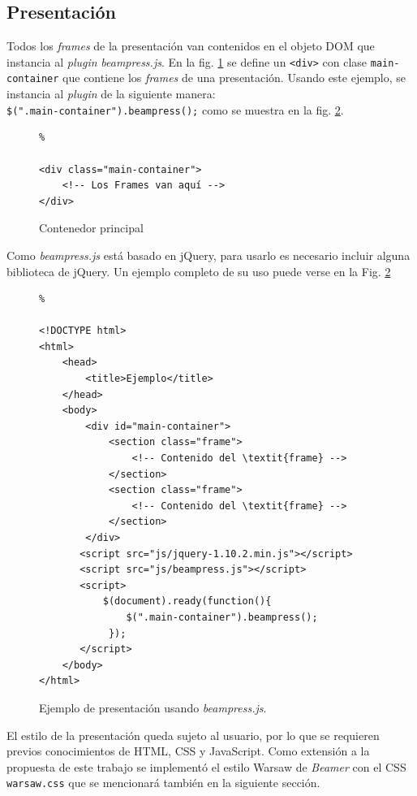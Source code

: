 		\subsection{Presentación} %
		\label{sub:presentacion}

			Todos los \textit{frames} de la presentación van contenidos en el objeto DOM que instancia al \textit{plugin} \textit{beampress.js}. En la fig. \ref{fig:main_container} se define un \texttt{<div>} con clase \texttt{main-container} que contiene los \textit{frames} de una presentación. Usando este ejemplo, se instancia al \textit{plugin} de la siguiente manera:\\ \texttt{\$(".main-container").beampress();} como se muestra en la fig. \ref{fig:ex5}.
		
			\begin{figure}[htb]%
				\begin{lstlisting}%

<div class="main-container">
	<!-- Los Frames van aquí -->
</div>
				\end{lstlisting}
			\caption{Contenedor principal}
			\label{fig:main_container}
			\end{figure}				


			Como \textit{beampress.js} está basado en jQuery, para usarlo es necesario incluir alguna biblioteca de jQuery. Un ejemplo completo de su uso puede verse en la Fig. \ref{fig:ex5}

			\begin{figure}[htb]%
				\begin{lstlisting}%

<!DOCTYPE html>
<html>
	<head>
    	<title>Ejemplo</title>
	</head>
	<body>
		<div id="main-container">
			<section class="frame">
				<!-- Contenido del \textit{frame} -->
			</section>
			<section class="frame">
				<!-- Contenido del \textit{frame} -->
			</section>						
		</div>
	   <script src="js/jquery-1.10.2.min.js"></script>
	   <script src="js/beampress.js"></script>
	   <script>
	       $(document).ready(function(){     
	           $(".main-container").beampress();
	        });
	   </script>		
	</body>
</html>			
				\end{lstlisting}
			\caption{
				Ejemplo de presentación usando \textit{beampress.js}. 
				\label{fig:ex5} }
			\end{figure}	

			El estilo de la presentación queda sujeto al usuario, por lo que se requieren previos conocimientos de HTML, CSS y JavaScript. Como extensión a la propuesta de este trabajo se implementó el estilo Warsaw de \textit{Beamer} con el CSS \texttt{warsaw.css} que se mencionará también en la siguiente sección.

